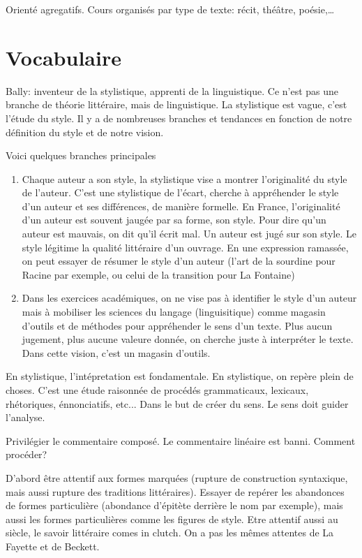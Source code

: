 \documentclass[a4paper]{report}
\theoremstyle{definition}
\theoremstyle{remark}
\begin{document}
Orienté agregatifs. Cours organisés par type de texte: récit, théâtre, poésie,\dots

\section{Vocabulaire}

Bally: inventeur de la stylistique, apprenti de la linguistique. Ce n'est pas une branche de théorie littéraire, mais de linguistique. La stylistique est vague, c'est l'étude du style. Il y a de nombreuses branches et tendances en fonction de notre définition du style et de notre vision. \par 

Voici quelques branches principales
\begin{enumerate}
    \item Chaque auteur a son style, la stylistique vise a montrer l'originalité du style de l'auteur. C'est une stylistique de l'écart, cherche à appréhender le style d'un auteur et ses différences, de manière formelle. En France, l'originalité d'un auteur est souvent jaugée par sa forme, son style. Pour dire qu'un auteur est mauvais, on dit qu'il écrit mal. Un auteur est jugé sur son style. Le style légitime la qualité littéraire d'un ouvrage. En une expression ramassée, on peut essayer de résumer le style d'un auteur (l'art de la sourdine pour Racine par exemple, ou celui de la transition pour La Fontaine)
    \item Dans les exercices académiques, on ne vise pas à identifier le style d'un auteur mais à mobiliser les sciences du langage (linguisitique) comme magasin d'outils et de méthodes pour appréhender le sens d'un texte. Plus aucun jugement, plus aucune valeure donnée, on cherche juste à interpréter le texte. Dans cette vision, c'est un magasin d'outils.
\end{enumerate}

En stylistique, l'intépretation est fondamentale. En stylistique, on repère plein de choses. C'est une étude raisonnée de procédés grammaticaux, lexicaux, rhétoriques, énnonciatifs, etc... Dans le but de créer du sens. Le sens doit guider l'analyse. \par 

Privilégier le commentaire composé. Le commentaire linéaire est banni. Comment procéder?\par 

D'abord être attentif aux formes marquées (rupture de construction syntaxique, mais aussi rupture des traditions littéraires). Essayer de repérer les abandonces de formes particulière (abondance d'épitète derrière le nom par exemple), mais aussi les formes particulières comme les figures de style. Etre attentif aussi au siècle, le savoir littéraire comes in clutch. On a pas les mêmes attentes de La Fayette et de Beckett. \par
\end{document}
